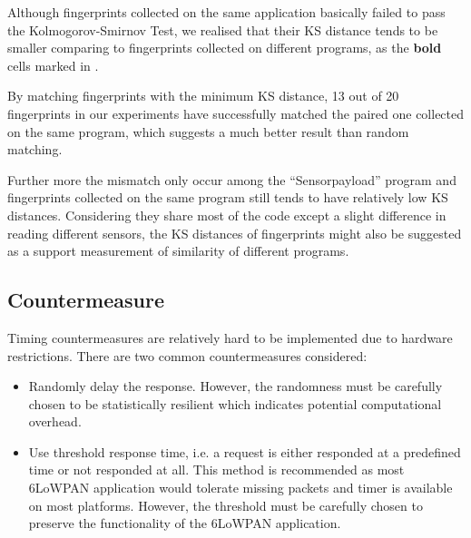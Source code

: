 Although fingerprints collected on the same application basically failed to pass the Kolmogorov-Smirnov Test, we realised that their KS distance tends to be smaller comparing to fingerprints collected on different programs, as the \textbf{bold} cells marked in . 

By matching fingerprints with the minimum KS distance, 13 out of 20 fingerprints in our experiments have successfully matched the paired one collected on the same program, which suggests a much better result than random matching.

Further more the mismatch only occur among the ``Sensorpayload'' program and fingerprints collected on the same program still tends to have relatively low KS distances. Considering they share most of the code except a slight difference in reading different sensors, the KS distances of fingerprints might also be suggested as a support measurement of similarity of different programs.

\subsection{Countermeasure}
Timing countermeasures are relatively hard to be implemented due to hardware restrictions. There are two common countermeasures considered:
\begin{itemize}
	\item Randomly delay the response. However, the randomness must be carefully chosen to be statistically resilient which indicates potential computational overhead.
	 
	\item Use threshold response time, i.e. a request is either responded at a predefined time or not responded at all. This method is recommended as most 6LoWPAN application would tolerate missing packets and timer is available on most platforms. However, the threshold must be carefully chosen to preserve the functionality of the 6LoWPAN application.
\end{itemize}